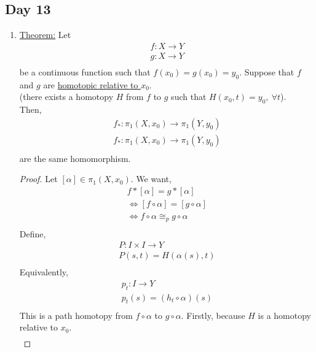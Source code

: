 \subsection{Day 13}
\begin{enumerate}
    \item \underline{Theorem:} 
        Let
        \begin{align*}
            f: X\rightarrow Y\\
            g: X\rightarrow Y\\
        \end{align*}
        be a continuous function such that $f(x_0)=g(x_0)=y_0$. Suppose that
        $f$ and $g$ are \underline{homotopic relative to $x_0$}.\\(there exists a homotopy
        $H$ from $f$ to $g$ such that $H(x_0, t)=y_0,\ \forall t$).\\
        Then,
        \begin{align*}
            f_*:\pi_1(X,x_0)\rightarrow \pi_1(Y,y_0)\\
            f_*:\pi_1(X,x_0)\rightarrow \pi_1(Y,y_0)\\
        \end{align*}
        are the same homomorphism.
        \begin{proof}
            Let $[\alpha]\in \pi_1(X,x_0)$. We want,
            \begin{align*}
                f*[\alpha]=g*[\alpha]\\
                \iff [f\circ \alpha]=[g\circ \alpha]\\
                \iff f\circ \alpha \cong_{p} g\circ\alpha\\
            \end{align*}
            Define,
            \begin{align*}
                P: I\times I \rightarrow Y\\
                P(s,t)=H(\alpha(s), t)\\
            \end{align*}
            Equivalently, 
            \begin{align*}
                p_t: I \rightarrow Y\\
                p_t(s)=(h_t\circ \alpha)(s)\\
            \end{align*}
            This is a path homotopy from $f\circ \alpha$ to $g\circ\alpha$.
            Firstly, because $H$ is a homotopy relative to $x_0$.
            \begin{align*}

\end{align*}
\end{proof}
\end{enumerate}
